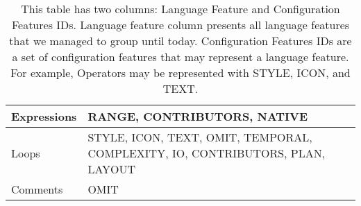 \begin{table}[H]
\begin{tabular}{|l|p{11cm}|}
Expressions                       & RANGE, CONTRIBUTORS, NATIVE                                                   \\ \hline
Loops                             & STYLE, ICON, TEXT, OMIT, TEMPORAL, COMPLEXITY, IO, CONTRIBUTORS, PLAN, LAYOUT \\ \hline
Comments                          & OMIT                                                                          \\ \hline
\end{tabular}
\caption{This table has two columns: Language Feature and Configuration Features IDs. Language feature column presents all language features that we managed to group until today. Configuration Features IDs are a set of configuration features that may represent a language feature. For example, Operators may be represented with STYLE, ICON, and TEXT.}
\label{tab15}
\end{table}
